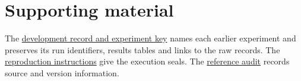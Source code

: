 \documentclass[11pt]{article}
\begin{document}
\section*{Supporting material}

The \href{https://github.com/RyoSpiralArchitect/self-fold/blob/v1.0.0/paper/DEVELOPMENT_RECORD.md}{development record and experiment key} names each earlier experiment and preserves its run identifiers, results tables and links to the raw records. The \href{https://github.com/RyoSpiralArchitect/self-fold/blob/v1.0.0/docs/REPRODUCING.md}{reproduction instructions} give the execution seals. The \href{https://github.com/RyoSpiralArchitect/self-fold/blob/v1.0.0/paper/REFERENCE_AUDIT.md}{reference audit} records source and version information.

\begingroup
\small
\setlength{\bibsep}{2pt plus 1pt}


\endgroup
\end{document}
